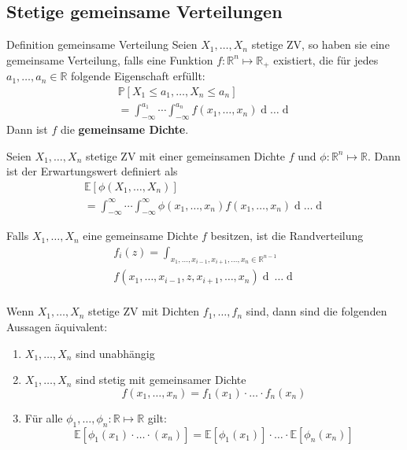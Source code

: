 \documentclass[a4paper,10pt]{article}
\def\R{\mathbb{R}}
\def\P{\mathbb{P}}
\def\E{\mathbb{E}}
\begin{document}
\subsection{Stetige gemeinsame Verteilungen}
\begin{subbox}{Definition gemeinsame Verteilung}
	Seien \(X_1, \ldots, X_n\) stetige ZV, so haben sie eine gemeinsame Verteilung, falls eine Funktion \(f: \R^n \mapsto \R_+\) existiert, die für jedes \(a_1, \ldots, a_n \in \R\) folgende Eigenschaft erfüllt:
	\begin{align*}
		\P[X_1 \le a_1, \ldots, X_n \le a_n] \\= \int_{-\infty}^{a_1} \cdots \int_{-\infty}^{a_n} f(x_1, \ldots, x_n) \mathop{dx_n} \ldots \mathop{dx_1}
	\end{align*}
	Dann ist \(f\) die \textbf{gemeinsame Dichte}.
\end{subbox}

Seien \(X_1, \ldots, X_n\) stetige ZV mit einer gemeinsamen Dichte \(f\) und \(\phi: \R^n \mapsto \R\). Dann ist der Erwartungswert definiert als
\begin{align*}
	\E[\phi(X_1, \ldots, X_n)] \\= \int_{-\infty}^\infty \cdots \int_{-\infty}^\infty \phi(x_1, \ldots, x_n) f(x_1, \ldots, x_n) \mathop{dx_n} \ldots \mathop{dx_1}
\end{align*}

Falls \(X_1, \ldots, X_n\) eine gemeinsame Dichte \(f\) besitzen, ist die Randverteilung
\begin{align*}
	f_i(z) = \int_{x_1, \ldots, x_{i-1}, x_{i+1}, \ldots, x_n \in \R^{n-1}}               \\
	f(x_1, \ldots, x_{i-1}, z, x_{i+1}, \ldots, x_n) \mathop{dx_n} \ \ldots \mathop{dx_1} \\
\end{align*}

Wenn \(X_1, \ldots, X_n\) stetige ZV mit Dichten \(f_1, \ldots, f_n\) sind, dann sind die folgenden Aussagen äquivalent:
\begin{enumerate}
	\item \(X_1, \ldots, X_n\) sind unabhängig
	\item \(X_1, \ldots, X_n\) sind stetig mit gemeinsamer Dichte
	      \[f(x_1, \ldots, x_n) = f_1(x_1) \cdot \ldots \cdot f_n(x_n)\]
	\item Für alle \(\phi_1, \ldots, \phi_n: \R \mapsto \R\) gilt:
	      \[\E[\phi_1 (x_1)\cdot \ldots\cdot (x_n)] = \E[\phi_1(x_1)] \cdot \ldots \cdot \E[\phi_n(x_n)]\]
\end{enumerate}
\end{document}
